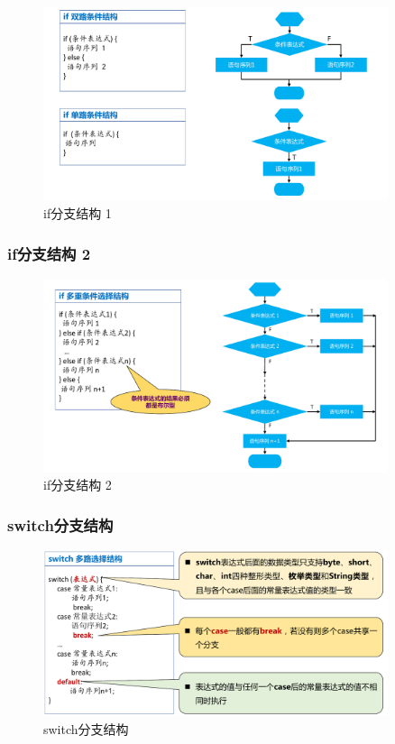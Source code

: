 \begin{figure}[htb]
\centering
\includegraphics[width=0.9\textwidth]{images/Java-language-basic-and-flow-control/fig-if-branch-1.pdf}
\caption{if分支结构 1}
\label{fig:if-branch-1}
\end{figure}

\subsubsection{if分支结构 2}

\begin{figure}[htb]
\centering
\includegraphics[width=0.9\textwidth]{images/Java-language-basic-and-flow-control/fig-if-branch-2.pdf}
\caption{if分支结构 2}
\label{fig:if-branch-2}
\end{figure}

\subsubsection{switch分支结构}

\begin{figure}[htb]
\centering
\includegraphics[width=0.9\textwidth]{images/Java-language-basic-and-flow-control/fig-switch-branch.pdf}
\caption{switch分支结构}
\label{fig:switch-branch}
\end{figure}

